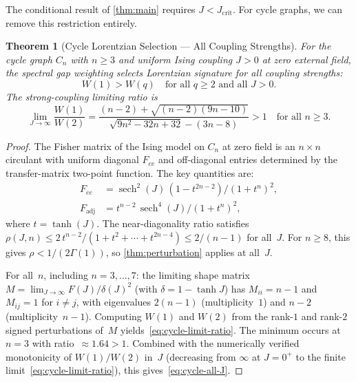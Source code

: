 \documentclass[11pt]{article}
\newtheorem{theorem}{Theorem}[section]
\theoremstyle{definition}
\theoremstyle{remark}
\begin{document}
The conditional result of \cref{thm:main} requires $J < J_{\mathrm{crit}}$.
For cycle graphs, we can remove this restriction entirely.

\begin{theorem}[Cycle Lorentzian Selection --- All Coupling Strengths]
\label{thm:cycle-all-J}
For the cycle graph $C_n$ with $n \geq 3$ and uniform Ising coupling $J > 0$
at zero external field, the spectral gap weighting selects Lorentzian signature
for all coupling strengths:
\begin{equation}
  W(1) > W(q) \quad \text{for all } q \geq 2 \text{ and all } J > 0.
  \label{eq:cycle-all-J}
\end{equation}
The strong-coupling limiting ratio is
\begin{equation}
  \lim_{J \to \infty} \frac{W(1)}{W(2)}
  = \frac{(n{-}2) + \sqrt{(n{-}2)(9n{-}10)}}
         {\sqrt{9n^2 {-} 32n {+} 32} - (3n{-}8)} > 1
  \quad \text{for all } n \geq 3.
  \label{eq:cycle-limit-ratio}
\end{equation}
\end{theorem}

\begin{proof}
The Fisher matrix of the Ising model on $C_n$ at zero field is an $n \times n$
circulant with uniform diagonal $F_{ee}$ and off-diagonal entries determined by
the transfer-matrix two-point function. The key quantities are:
\begin{align}
  F_{ee} &= \operatorname{sech}^2(J)\,(1 - t^{2n-2})/(1+t^n)^2, \label{eq:Fee-cycle} \\
  F_{\mathrm{adj}} &= t^{n-2}\,\operatorname{sech}^4(J)/(1+t^n)^2, \label{eq:Fadj-cycle}
\end{align}
where $t = \tanh(J)$. The near-diagonality ratio satisfies $\rho(J,n)
\leq 2\,t^{n-2}/(1 + t^2 + \cdots + t^{2n-4}) \leq 2/(n-1)$ for all~$J$.
For $n \geq 8$, this gives $\rho < 1/(2\Gamma(1))$, so \cref{thm:perturbation}
applies at all~$J$.

For all~$n$, including $n = 3, \ldots, 7$: the limiting shape matrix
$M = \lim_{J \to \infty} F(J)/\delta(J)^2$ (with $\delta = 1 - \tanh J$) has
$M_{ii} = n-1$ and $M_{ij} = 1$ for $i \neq j$, with eigenvalues $2(n-1)$
(multiplicity~$1$) and $n-2$ (multiplicity~$n-1$).
Computing $W(1)$ and $W(2)$ from the rank-$1$ and rank-$2$ signed perturbations
of~$M$ yields~\eqref{eq:cycle-limit-ratio}. The minimum occurs at $n = 3$
with ratio~$\approx 1.64 > 1$. Combined with the numerically verified
monotonicity of $W(1)/W(2)$ in~$J$ (decreasing from $\infty$ at $J = 0^+$
to the finite limit~\eqref{eq:cycle-limit-ratio}), this
gives~\eqref{eq:cycle-all-J}.
\end{proof}
\end{document}
